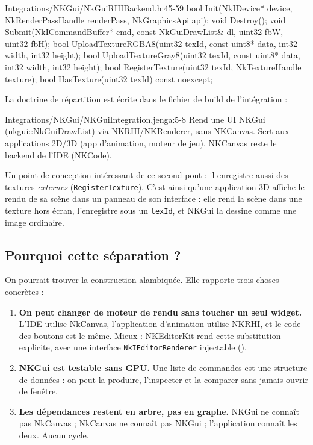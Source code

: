 \begin{nkcode}{Integrations/NKGui/NkGuiRHIBackend.h:45-59}
bool Init(NkIDevice* device, NkRenderPassHandle renderPass, NkGraphicsApi api);
void Destroy();
void Submit(NkICommandBuffer* cmd, const NkGuiDrawList& dl, uint32 fbW, uint32 fbH);
bool UploadTextureRGBA8(uint32 texId, const uint8* data, int32 width, int32 height);
bool UploadTextureGray8(uint32 texId, const uint8* data, int32 width, int32 height);
bool RegisterTexture(uint32 texId, NkTextureHandle texture);
bool HasTexture(uint32 texId) const noexcept;
\end{nkcode}

La doctrine de répartition est écrite dans le fichier de build de l'intégration :

\begin{nkcode}{Integrations/NKGui/NKGuiIntegration.jenga:5-8}
Rend une UI NKGui (nkgui::NkGuiDrawList) via NKRHI/NKRenderer, sans NKCanvas.
Sert aux applications 2D/3D (app d'animation, moteur de jeu). NKCanvas reste
le backend de l'IDE (NKCode).
\end{nkcode}

Un point de conception intéressant de ce second pont : il enregistre aussi des
textures \emph{externes} (\texttt{RegisterTexture}). C'est ainsi qu'une
application 3D affiche le rendu de sa scène dans un panneau de son interface :
elle rend la scène dans une texture hors écran, l'enregistre sous un
\texttt{texId}, et NKGui la dessine comme une image ordinaire.

\subsection{Pourquoi cette séparation ?}

On pourrait trouver la construction alambiquée. Elle rapporte trois choses
concrètes :

\begin{enumerate}
  \item \textbf{On peut changer de moteur de rendu sans toucher un seul
        widget.} L'IDE utilise NkCanvas, l'application d'animation utilise NKRHI,
        et le code des boutons est le même. Mieux : NKEditorKit rend cette
        substitution explicite, avec une interface
        \texttt{NkIEditorRenderer} injectable
        ().
  \item \textbf{NKGui est testable sans GPU.} Une liste de commandes est une
        structure de données : on peut la produire, l'inspecter et la comparer
        sans jamais ouvrir de fenêtre.
  \item \textbf{Les dépendances restent en arbre, pas en graphe.} NKGui ne
        connaît pas NkCanvas ; NkCanvas ne connaît pas NKGui ; l'application
        connaît les deux. Aucun cycle.
\end{enumerate}

